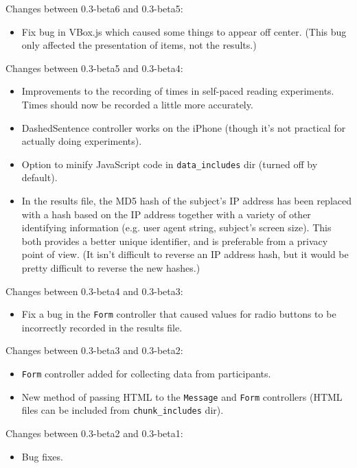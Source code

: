 \documentclass[11pt,letterpaper]{article}
\begin{document}
Changes between 0.3-beta6 and 0.3-beta5:
\begin{itemize}

\item
 Fix bug in VBox.js which caused some things to appear off center. (This bug only affected the presentation of items, not the results.)
\end{itemize}
Changes between 0.3-beta5 and 0.3-beta4:
\begin{itemize}

\item
 Improvements to the recording of times in self-paced reading experiments. Times should now be recorded a little more accurately.
\item
 DashedSentence controller works on the iPhone (though it's not practical for actually doing experiments).
\item
 Option to minify JavaScript code in \texttt{data\_includes} dir (turned off by default).
\item
 In the results file, the MD5 hash of the subject's IP address has been replaced with a hash based on the IP address together with a variety of other identifying information (e.g. user agent string, subject's screen size). This both provides a better unique identifier, and is preferable from a privacy point of view. (It isn't difficult to reverse an IP address hash, but it would be pretty difficult to reverse the new hashes.)
\end{itemize}
Changes between 0.3-beta4 and 0.3-beta3:
\begin{itemize}

\item
 Fix a bug in the \texttt{Form} controller that caused values for radio buttons to be incorrectly recorded in the results file.
\end{itemize}
Changes between 0.3-beta3 and 0.3-beta2:
\begin{itemize}

\item
 \texttt{Form} controller added for collecting data from participants.
\item
 New method of passing HTML to the \texttt{Message} and \texttt{Form} controllers (HTML files can be included from \texttt{chunk\_includes} dir).
\end{itemize}
Changes between 0.3-beta2 and 0.3-beta1:
\begin{itemize}

\item
 Bug fixes.
\end{itemize}
\end{document}
